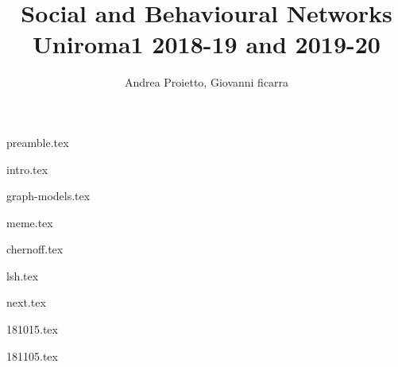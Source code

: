 \documentclass{report}
\title{
    Social and Behavioural Networks \\
    \large Uniroma1 2018-19 and 2019-20
}
\author{Andrea Proietto, Giovanni ficarra}
\theoremstyle{definition}
\theoremstyle{remark}
\theoremstyle{remark}
\begin{document}
\maketitle

\tableofcontents

{preamble.tex}

{intro.tex}

{graph-models.tex}

{meme.tex}

{chernoff.tex}
	
{lsh.tex}

{next.tex}

{181015.tex}

{181105.tex}

\end{document}
